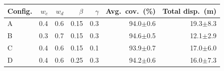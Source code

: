 \begin{tabular}{@{}lrrrrrr@{}}
\toprule
Config. & $w_c$ & $w_d$ & $\beta$ & $\gamma$ & Avg.\ cov.\ (\%) & Total disp.\ (m)\\
\midrule
A & 0.4 & 0.6 & 0.15 & 0.3 & 94.0$\pm$0.6 & 19.3$\pm$8.3 \\
B & 0.3 & 0.7 & 0.15 & 0.3 & 94.6$\pm$0.5 & 12.1$\pm$2.9 \\
C & 0.4 & 0.6 & 0.15 & 0.1 & 93.9$\pm$0.7 & 17.0$\pm$6.0 \\
D & 0.4 & 0.6 & 0.25 & 0.3 & 94.2$\pm$0.6 & 16.0$\pm$7.3 \\
\bottomrule
\end{tabular}
